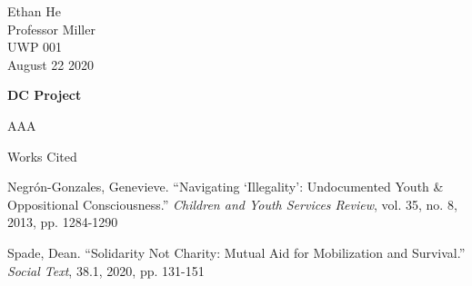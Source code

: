 \documentclass[12pt]{article}
\newcommand{\bibent}{\noindent \hangindent 40pt}
\newenvironment{workscited}{\newpage \begin{center} Works Cited \end{center}}{\newpage }
\begin{document}
\begin{flushleft}

Ethan He \\
Professor Miller \\
UWP 001 \\
August 22 2020 \\

\begin{center}
    \textbf{DC Project}
\end{center}

\setlength{\parindent}{0.5in}

AAA

\begin{workscited}

\bibent
Negr\'{o}n-Gonzales, Genevieve. ``Navigating `Illegality': Undocumented Youth \& Oppositional Consciousness.'' \textit{Children and Youth Services Review}, vol. 35, no. 8, 2013, pp. 1284-1290

\bibent
Spade, Dean. ``Solidarity Not Charity: Mutual Aid for Mobilization and Survival.'' \textit{Social Text}, 38.1, 2020, pp. 131-151


\end{workscited}

\end{flushleft}
\end{document}
